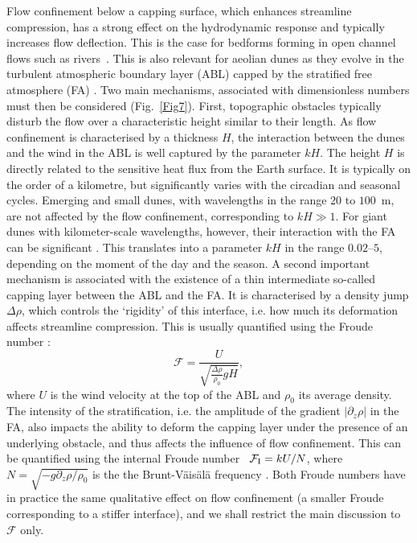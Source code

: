 Flow confinement below a capping surface, which enhances streamline compression, has a strong effect on the hydrodynamic response and typically increases flow deflection. This is the case for bedforms forming in open channel flows such as rivers~\citep{Kennedy1963, Chang1970, Mizumura1995, Colombini2004, Fourriere2010, Andreotti2012, Unsworth2018}. This is also relevant for aeolian dunes as they evolve in the turbulent atmospheric boundary layer (ABL) capped by the stratified free atmosphere (FA) \citep{Andreotti2009}. Two main mechanisms, associated with dimensionless numbers must then be considered (Fig.~\ref{Fig7}). First, topographic obstacles typically disturb the flow over a characteristic height similar to their length. As flow confinement is characterised by a thickness $H$, the interaction between the dunes and the wind in the ABL is well captured by the parameter $k H$. The height $H$ is directly related to the sensitive heat flux from the Earth surface. It is typically on the order of a kilometre, but significantly varies with the circadian and seasonal cycles. Emerging and small dunes, with wavelengths in the range $20$ to $100$~m, are not affected by the flow confinement, corresponding to $k H \gg 1$. For giant dunes with kilometer-scale wavelengths, however, their interaction with the FA can be significant \citep{Andreotti2009}. This translates into a parameter $kH$ in the range $0.02$--$5$, depending on the moment of the day and the season. A second important mechanism is associated with the existence of a thin intermediate so-called capping layer between the ABL and the FA. It is characterised by a density jump $\Delta\rho$, which controls the `rigidity' of this interface, i.e. how much its deformation affects streamline compression. This is usually quantified using the Froude number \citep{Vosper2004, Stull2006, Sheridan2006, Hunt2006, Jiang2014}:
%
\begin{equation}
\mathcal{F} = \displaystyle\frac{U}{\sqrt{\displaystyle\frac{\Delta\rho}{\rho_{0}}gH}},
\label{FroudeNumber}
\end{equation}
%
where $U$ is the wind velocity at the top of the ABL and $\rho_{0}$ its average density. The intensity of the stratification, i.e. the amplitude of the gradient $\left | \partial_z \rho \right|$ in the FA, also impacts the ability to deform the capping layer under the presence of an underlying obstacle, and thus affects the influence of flow confinement. This can be quantified using the internal Froude number~\citep{Vosper2004, Stull2006, Sheridan2006, Hunt2006, Jiang2014} $\mathcal{F}_{\textup{I}} = k U/N$, where $N = \sqrt{-g \partial_z \rho / \rho_{0}}$ is the the Brunt-V\"ais\"al\"a frequency \citep{Stull1988}. Both Froude numbers have in practice the same qualitative effect on flow confinement (a smaller Froude corresponding to a stiffer interface), and we shall restrict the main discussion to $\mathcal{F}$ only.

